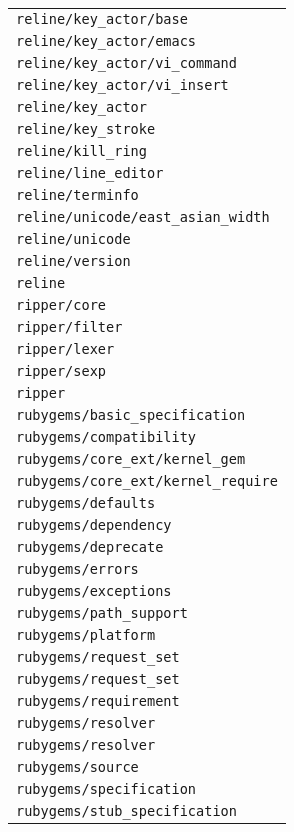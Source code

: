 \begin{longtable}{l}
\texttt{reline/key\_actor/base} \\
\texttt{reline/key\_actor/emacs} \\
\texttt{reline/key\_actor/vi\_command} \\
\texttt{reline/key\_actor/vi\_insert} \\
\texttt{reline/key\_actor} \\
\texttt{reline/key\_stroke} \\
\texttt{reline/kill\_ring} \\
\texttt{reline/line\_editor} \\
\texttt{reline/terminfo} \\
\texttt{reline/unicode/east\_asian\_width} \\
\texttt{reline/unicode} \\
\texttt{reline/version} \\
\texttt{reline} \\
\texttt{ripper/core} \\
\texttt{ripper/filter} \\
\texttt{ripper/lexer} \\
\texttt{ripper/sexp} \\
\texttt{ripper} \\
\texttt{rubygems/basic\_specification} \\
\texttt{rubygems/compatibility} \\
\texttt{rubygems/core\_ext/kernel\_gem} \\
\texttt{rubygems/core\_ext/kernel\_require} \\
\texttt{rubygems/defaults} \\
\texttt{rubygems/dependency} \\
\texttt{rubygems/deprecate} \\
\texttt{rubygems/errors} \\
\texttt{rubygems/exceptions} \\
\texttt{rubygems/path\_support} \\
\texttt{rubygems/platform} \\
\texttt{rubygems/request\_set} \\
\texttt{rubygems/request\_set} \\
\texttt{rubygems/requirement} \\
\texttt{rubygems/resolver} \\
\texttt{rubygems/resolver} \\
\texttt{rubygems/source} \\
\texttt{rubygems/specification} \\
\texttt{rubygems/stub\_specification} \\

\end{longtable}
